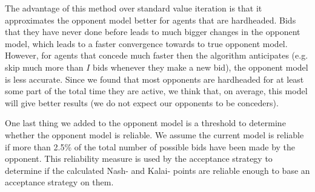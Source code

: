 The advantage of this method over standard value iteration is that it approximates the opponent model better for agents that are hardheaded. 
Bids that they have never done before leads to much bigger changes in the opponent model, which leads to a faster convergence towards to true opponent model. 
However, for agents that concede much faster then the algorithm anticipates (e.g. skip much more than $I$ bids whenever they make a new bid), the opponent model is less accurate. 
Since we found that most opponents are hardheaded for at least some part of the total time they are active, we think that, on average, this model will give better results (we do not expect our opponents to be conceders).

One last thing we added to the opponent model is a threshold to determine whether the opponent model is reliable. We assume the current model is reliable if more than 2.5\% of the total number of possible bids have been made by the opponent. This reliability measure is used by the acceptance strategy to determine if the calculated Nash- and Kalai- points are reliable enough to base an acceptance strategy on them.